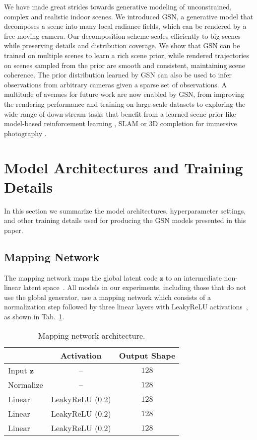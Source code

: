 \documentclass[10pt,twocolumn,letterpaper]{article}
\begin{document}
We have made great strides towards generative modeling of unconstrained, complex and realistic indoor scenes. We introduced GSN, a generative model that decomposes a scene into many local radiance fields, which can be rendered by a free moving camera. Our decomposition scheme scales efficiently to big scenes while preserving details and distribution coverage. We show that GSN can be trained on multiple scenes to learn a rich scene prior, while rendered trajectories on scenes sampled from the prior are smooth and consistent, maintaining scene coherence. The prior distribution learned by GSN can also be used to infer observations from arbitrary cameras given a sparse set of observations. A multitude of avenues for future work are now enabled by GSN, from improving the rendering performance and training on large-scale datasets to exploring the wide range of down-stream tasks that benefit from a learned scene prior like model-based reinforcement learning \cite{gamegan}, SLAM \cite{neuralslam1} or 3D completion for immersive photography \cite{nerfies}.

{\small


}

\clearpage
\appendix
\section{Model Architectures and Training Details} In this section we summarize the model architectures, hyperparameter settings, and other training details used for producing the GSN models presented in this paper.

\subsection{Mapping Network}
The mapping network maps the global latent code $\textbf{z}$ to an intermediate non-linear latent space~\cite{stylegan}. All models in our experiments, including those that do not use the global generator, use a mapping network which consists of a normalization step followed by three linear layers with LeakyReLU activations~\cite{leakyrelu}, as shown in Tab.~\ref{tab:mapping_network_architecture}.

\begin{table}[h]
	\small
	\centering
	\begin{tabular}{lcc}
		\toprule
		& Activation & Output Shape \\
		\midrule
		Input $\textbf{z}$ & -- & $128$ \\
		Normalize & -- & $128$ \\
		Linear & LeakyReLU (0.2) & $128$ \\
		Linear & LeakyReLU (0.2) & $128$ \\
		Linear & LeakyReLU (0.2) & $128$ \\
		\bottomrule
	\end{tabular}
	\caption{Mapping network architecture.}
	\label{tab:mapping_network_architecture}
\end{table}
\end{document}
